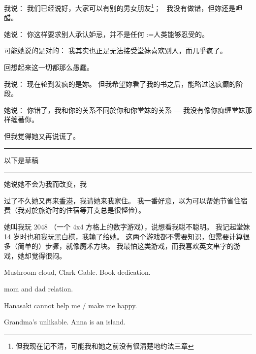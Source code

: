 \documentclass[12pt]{report}
\makeatletter
\newcommand{\cc}[2]{#1}
\newcommand{\cc}[2]{#2}
\renewcommand{\d}[1]{$\underaccent{\scalebox{0.5}{\textbullet}}{\textrm{#1}}$}
\newcommand{\ds}[1]{%
  \@tfor\next:=#1\do{\d{\next}}}
\newcommand*\todo{\begin{center}\color{red}  \rule{5cm}{0.5pt} 以下是草稿\, \rule{5cm}{0.5pt} \end{center}}
\makeatother
\begin{document}
{{}

\cc{
我说： 我们已经说好，大家可以有别的男女朋友\footnote{但我现在记不清，可能我和她之前没有很清楚地约法三章}；~ 我没有做错，但妳还是呷醋。
}{
	
}

\cc{
她说： 你这样要求别人承认妒忌，并不是任何\ds{人类}能够忍受的。
}{
	
}

\cc{
可能她说的是对的：  我其实也正是无法接受堂妹喜欢别人，而几乎疯了。
}{
	
}

\cc{
回想起来这一切都那么愚蠢。
}{
	
}

\cc{
我说： 现在轮到发疯的是妳。  但我希望妳看了我的书之后，能略过这疯癫的阶段。
}{
	
}

\cc{
她说： 你错了，我和你的关系不同於你和你堂妹的关系 --- 我没有像你痴缠堂妹那样缠著你。
}{
	
}

\cc{
但我觉得她又再说谎了。
}{
	
}

\todo

\cc{
她说她不会为我而改变，我
}{
	
}

\cc{
过了不久她又再来\uline{香港}，我请她来我家住。 我一番好意，以为可以帮她节省住宿费（我对於旅游时的住宿等开支总是很悭俭）。
}{
	
}


\cc{
她叫我玩 2048 （一个 4x4 方格上的数字游戏），说想看我聪不聪明。 我记起堂妹 14 岁时也和我玩黑白棋，我输了给她。  这两个游戏都不需要知识，但需要计算很多（简单的）步骤，就像魔术方块。  我最怕这类游戏，而我喜欢英文串字的游戏，她却觉得很闷。
}{
	
}

\cc{
Mushroom cloud, Clark Gable.  Book dedication.
}{
	
}

\cc{
mom and dad relation.
}{
	
}

\cc{
Hanasaki cannot help me / make me happy.
}{
	
}

\cc{
Grandma's unlikable.  Anna is an island.
}{
	
}


}
\end{document}

